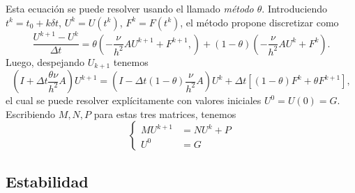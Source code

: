 \documentclass[11pt,letterpaper]{report}
\begin{document}
Esta ecuación se puede resolver usando el llamado \emph{método
$\theta$}. Introduciendo $t^{k}=t_0+k\delta t$, $U^{k}=U(t^{k})$,
$F^{k}=F(t^{k})$, el método propone discretizar como
\begin{equation}
  \frac{U^{k+1}-U^k}{\Delta t}
  =
  \theta
  \left( -\frac{\nu}{h^{2}}AU^{k+1} + F^{k+1}, \right)
  +
  (1-\theta)
  \left( -\frac{\nu}{h^{2}}AU^{k} + F^{k} \right)
.\end{equation}
Luego, despejando $U_{k+1}$ tenemos
\begin{equation}
  \left( I
    +
    \Delta t
    \frac{\theta\nu}{h^{2}}A
  \right)
  U^{k+1}
  =
    \left(
      I-
      \Delta t
      (1-\theta)
      \frac{\nu}{h^{2}}A
    \right)
    U^k
    +
    \Delta t[
    (1-\theta)
    F^{k}
    +
    \theta
    F^{k+1}]
,\end{equation}
el cual se puede resolver explícitamente con valores iniciales
$U^{0}=U(0)=G$.
Escribiendo $M,N,P$ para estas tres matrices, tenemos
\begin{equation}
  \left\{
    \begin{aligned}
      M U^{k+1} &= NU^{k} + P
      \\
      U^{0} &= G
    \end{aligned}
  \right.
\end{equation}

\subsection{Estabilidad}
\end{document}
